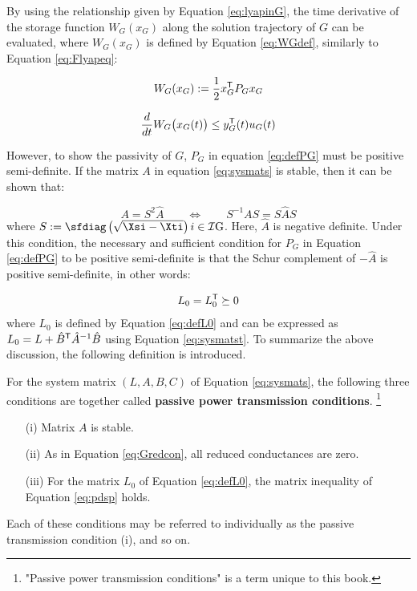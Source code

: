 \documentclass[graybox, envcountchap]{svmult}
\begin{document}
By using the relationship given by Equation \ref{eq:lyapinG}, the time
derivative of the storage function $W_G(x_G)$ along the solution trajectory of
$G$ can be evaluated, where $W_G(x_G)$ is defined by Equation \ref{eq:WGdef},
similarly to Equation \ref{eq:Flyapeq}:

\begin{equation}\label{eq:WGdef}
  W_G(x_G):= \frac{1}{2}x_G^{\sf T}P_Gx_G
\end{equation}

\begin{align}\label{eq:Glyapeq}
\frac{d}{dt} W_G \bigl( x_G (t) \bigr)
 \leq 
y_G^{\sf T}(t) u_G(t)
\end{align}

However, to show the passivity of $G$, $P_G$ in equation \ref{eq:defPG} must be
positive semi-definite. If the matrix $A$ in equation \ref{eq:sysmats} is
stable, then it can be shown that:

\[
  A= S^2 \hat{A}
  \qquad \Longleftrightarrow \qquad S^{-1} A S = S \hat{A} S
\]
where $S:=\sfdiag \left( \sqrt{ \Xsi - \Xti }\right){i \in \mathcal{I}{\rm G} }$.
Here, $\hat{A}$ is negative definite. Under this condition, the necessary and
sufficient condition for $P_G$ in Equation \ref{eq:defPG} to be positive
semi-definite is that the Schur complement of $-\hat{A}$ is positive
semi-definite, in other words:

\begin{align}\label{eq:pdsp}
L_0 =L_0^{\sf T} \succeq 0
\end{align}
where $L_0$ is defined by Equation \ref{eq:defL0} and can be expressed as $L_0 =
L + \hat{B}^{\sf T} \hat{A}^{-1} \hat{B}$ using Equation \ref{eq:sysmatst}. To
summarize the above discussion, the following definition is introduced.

\begin{definition}\label{def:passtrans}
For the system matrix $(L,A,B,C)$ of Equation \ref{eq:sysmats}, the following
three conditions are together called \textbf{passive power transmission
conditions}.
\footnote{
"Passive power transmission conditions" is a term unique to this book.
}
\begin{itemize}
  \item[(i)] Matrix $A$ is stable.
  \item[(ii)] As in Equation \ref{eq:Gredcon}, all reduced conductances are zero. 
  \item[(iii)] For the matrix $L_0$ of Equation \ref{eq:defL0}, the matrix inequality of Equation \ref{eq:pdsp} holds. 
\end{itemize}

Each of these conditions may be referred to individually as the passive
transmission condition (i), and so on.
\end{definition}
\end{document}
